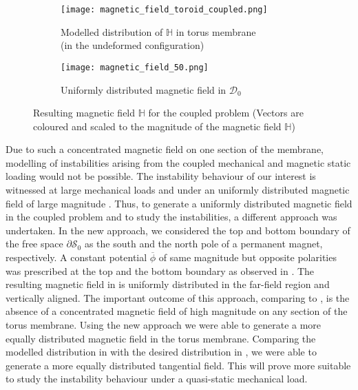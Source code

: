 \begin{figure}[h!]
\centering
\begin{subfigure}{0.59\textwidth}
\centering
\texttt{[image: magnetic\_field\_toroid\_coupled.png]}
\caption{Modelled distribution of $\mathbb{H}$ in torus membrane \\ (in the undeformed configuration)}
\label{fig:3.5.1}
\end{subfigure}
\begin{subfigure}{0.39\textwidth}
\centering
\texttt{[image: magnetic\_field\_50.png]}
\caption{Uniformly distributed magnetic field in $\mathcal{D}_0$}
\label{fig:3.5.2}
\end{subfigure}
\caption{Resulting magnetic field $\mathbb{H}$ for the coupled problem (Vectors are coloured and scaled to the magnitude of the magnetic field $\mathbb{H}$)}
\label{fig:3.5}
\end{figure}

Due to such a concentrated magnetic field on one section of the membrane, modelling of instabilities arising from the coupled  mechanical and magnetic static loading would not be possible. The instability behaviour of our interest is witnessed at large mechanical loads and under an uniformly distributed magnetic field of large magnitude \cite{reddy_toroid,Reddy2018}. Thus, to generate a uniformly distributed magnetic field in the coupled problem and to study the instabilities, a different approach was undertaken. In the new approach, we considered the top and bottom boundary of the free space $\partial \mathcal{S}_0$ as the south and the north pole of a permanent magnet, respectively. A constant potential $\overline{\phi}$ of same magnitude but opposite polarities was prescribed at the top and the bottom boundary as observed in . The resulting magnetic field in  is uniformly distributed in the far-field region and vertically aligned. The important outcome of this approach, comparing  to , is the absence of a concentrated magnetic field of high magnitude on any section of the torus membrane. Using the new approach we were able to generate a more equally distributed magnetic field in the torus membrane. Comparing the modelled distribution in  with the desired distribution in , we were able to generate a more equally distributed tangential field. This will prove more suitable to study the instability behaviour under a quasi-static mechanical load. \par 

